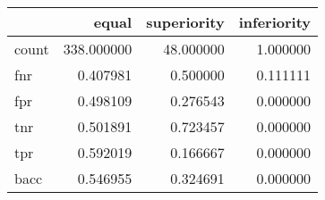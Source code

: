 \begin{tabular}{lrrr}
\toprule
{} &       equal &  superiority &  inferiority \\
\midrule
count &  338.000000 &    48.000000 &     1.000000 \\
fnr   &    0.407981 &     0.500000 &     0.111111 \\
fpr   &    0.498109 &     0.276543 &     0.000000 \\
tnr   &    0.501891 &     0.723457 &     0.000000 \\
tpr   &    0.592019 &     0.166667 &     0.000000 \\
bacc  &    0.546955 &     0.324691 &     0.000000 \\
\bottomrule
\end{tabular}
